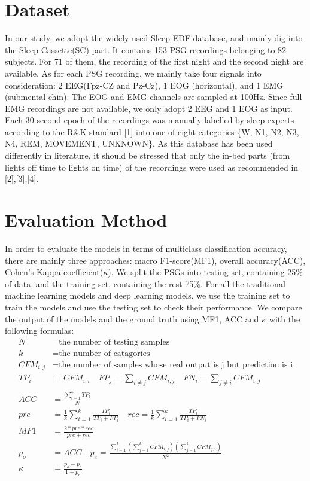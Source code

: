\documentclass{article}
\begin{document}
\section{Dataset}
In our study, we adopt the widely used Sleep-EDF database, and mainly dig into the Sleep Cassette(SC) part. 
It contains 153 PSG recordings belonging to 82 subjects. 
For 71 of them, the recording of the first night and the second night are available. 
As for each PSG recording, we mainly take four signals into consideration: 2 EEG(Fpz-CZ and Pz-Cz), 1 EOG (horizontal), and 1 EMG (submental chin). 
The EOG and EMG channels are sampled at 100Hz. Since full EMG recordings are not available, we only adopt 2 EEG and 1 EOG as input. 
Each 30-second epoch of the recordings was manually labelled by sleep experts according to the R\&K standard [1] into one of eight categories \{W, N1, N2, N3, N4, REM, MOVEMENT, UNKNOWN\}. 
As this database has been used differently in literature, it should be stressed that only the in-bed parts (from lights off time to lights on time) of the recordings were used as recommended in [2],[3],[4].

\section{Evaluation Method}
In order to evaluate the models in terms of multiclass classification accuracy, there are mainly three approaches: macro F1-score(MF1), overall accuracy(ACC), Cohen's Kappa coefficient($\kappa$). We split the PSGs into testing set, containing 25\% of data, and the training set, containing the rest 75\%. For all the traditional machine learning models and deep learning models, we use the training set to train the models and use the testing set to check their performance. We compare the output of the models and the ground truth using MF1, ACC and $\kappa$ with the following formulas:
$$
\begin{aligned}
N&=\text{the number of testing samples}\\
k&=\text{the number of catagories}\\
CFM_{i,j}&=\text{the number of samples whose real output is j but prediction is i}\\
TP_i&=CFM_{i,i}\quad FP_j=\sum_{i\neq j}CFM_{i,j}\quad FN_i=\sum_{j\neq i}CFM_{i,j}\\
ACC&=\frac{\sum_{i=1}^{k}TP_i}{N}\\
pre&=\frac{1}{k}\sum_{i=1}^k\frac{TP_i}{TP_i+FP_i}\quad rec=\frac{1}{k}\sum_{i=1}^k\frac{TP_i}{TP_i+FN_i}\\
MF1&=\frac{2*pre*rec}{pre+rec}\\
p_o&=ACC\quad p_e=\frac{\sum_{i=1}^{k}(\sum_{j=1}^kCFM_{i,j})(\sum_{j=1}^kCFM_{j,i})}{N^2}\\
\kappa&=\frac{p_o-p_e}{1-p_e}
\end{aligned}
$$
\end{document}
